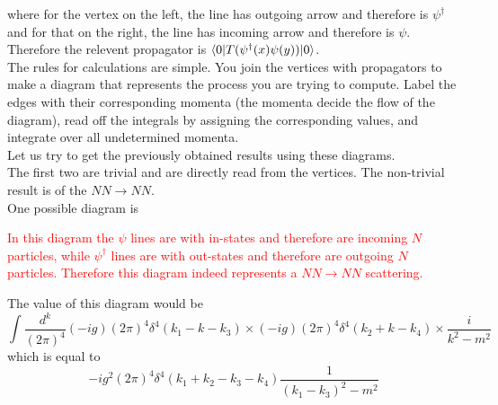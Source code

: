 \documentclass[11pt]{article}
\numberwithin{equation}{section}
\begin{document}
    where for the vertex on the left, the line has outgoing arrow and therefore is \(\psi^\dagger\) and for that on the right, the line has incoming arrow and therefore is \(\psi\). Therefore the relevent propagator is \(\braket{0|T(\psi^\dagger(x)\psi(y))|0}\).\\
    
    
    The rules for calculations are simple. You join the vertices with propagators to make a diagram that represents the process you are trying to compute. Label the edges with their corresponding momenta (the momenta decide the flow of the diagram), read off the integrals by assigning the corresponding values, and integrate over all undetermined momenta.\\

    Let us try to get the previously obtained results using these diagrams.\\ The first two are trivial and are directly read from the vertices. The non-trivial result is of the \(NN \to NN\). \\ One possible diagram is 
    \begin{figure}[h]
        \centering
    \end{figure}

    \textcolor{red}{
        In this diagram the \(\psi\) lines are with in-states and therefore are incoming \(N\) particles, while \(\psi^\dagger\) lines are with out-states and therefore are outgoing \(N\) particles. Therefore this diagram indeed represents a \(NN\to NN\) scattering.\\
    }

    The value of this diagram would be 
    \begin{equation*}
        \int \frac{d^k}{(2\pi)^4}(-ig)(2\pi)^4\delta^4(k_1 - k - k_3)\times(-ig)(2\pi)^4\delta^4(k_2 + k - k_4)\times \frac{i}{k^2 - m^2} 
    \end{equation*}
    which is equal to 
    \begin{equation*}
        -ig^2 (2\pi)^4\delta^4(k_1 +k_2 - k_3 - k_4) \frac{1}{(k_1 - k_3)^2 - m^2}
    \end{equation*}
\end{document}
